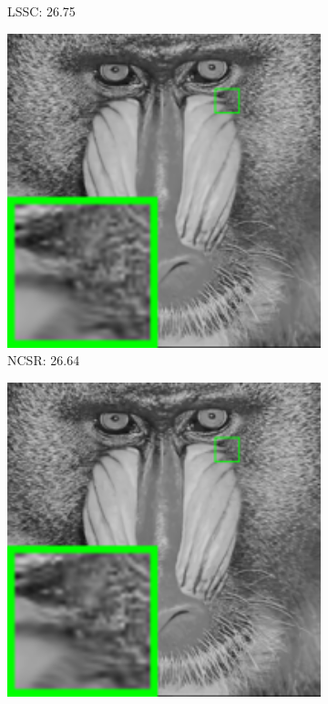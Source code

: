 \begin{figure}
\begin{adjustwidth}{-2cm}{}
\begin{subfigure}[t]{0.19\textwidth}
		\caption{LSSC: 26.75}
    \end{subfigure}
    \hfill
    \begin{subfigure}[t]{0.19\textwidth}
        \centering
        \includegraphics[width=1\textwidth]{images/twsc/awgn/resize_br_NCSR_20_baboon.png}
		\caption{NCSR: 26.64}
    \end{subfigure}
    \hfill
    \begin{subfigure}[t]{0.19\textwidth}
        \centering
        \includegraphics[width=1\textwidth]{images/twsc/awgn/resize_br_WNNM_20_baboon.png}

\end{subfigure}
\end{adjustwidth}
\end{figure}

